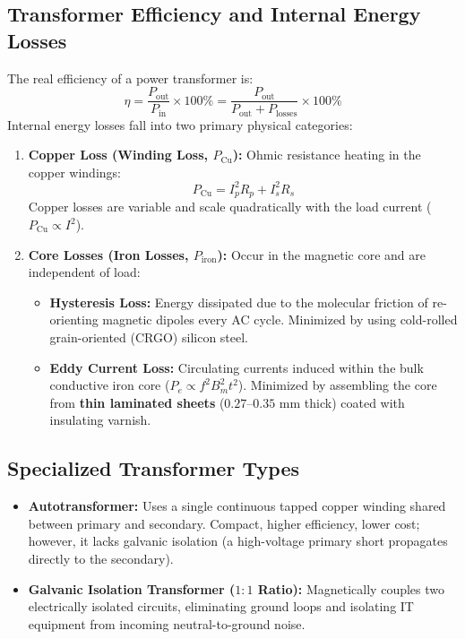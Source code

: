 \subsection{Transformer Efficiency and Internal Energy Losses}
The real efficiency of a power transformer is:
\begin{equation}
\label{eq:transformer_eff}
\eta = \frac{P_{\text{out}}}{P_{\text{in}}} \times 100\% = \frac{P_{\text{out}}}{P_{\text{out}} + P_{\text{losses}}} \times 100\%
\end{equation}
Internal energy losses fall into two primary physical categories:
\begin{enumerate}[label=\bfseries\arabic*.]
    \item \textbf{Copper Loss (Winding Loss, $P_{\text{Cu}}$):} Ohmic resistance heating in the copper windings:
    \begin{equation}
    \label{eq:copper_loss}
    P_{\text{Cu}} = I_p^2 R_p + I_s^2 R_s
    \end{equation}
    Copper losses are variable and scale quadratically with the load current ($P_{\text{Cu}} \propto I^2$).
    \item \textbf{Core Losses (Iron Losses, $P_{\text{iron}}$):} Occur in the magnetic core and are independent of load:
    \begin{itemize}
        \item \textbf{Hysteresis Loss:} Energy dissipated due to the molecular friction of re-orienting magnetic dipoles every AC cycle. Minimized by using cold-rolled grain-oriented (CRGO) silicon steel.
        \item \textbf{Eddy Current Loss:} Circulating currents induced within the bulk conductive iron core ($P_e \propto f^2 B_m^2 t^2$). Minimized by assembling the core from \textbf{thin laminated sheets} ($0.27$--$0.35\text{ mm}$ thick) coated with insulating varnish.
    \end{itemize}
\end{enumerate}

\subsection{Specialized Transformer Types}
\begin{itemize}
    \item \textbf{Autotransformer:} Uses a single continuous tapped copper winding shared between primary and secondary. Compact, higher efficiency, lower cost; however, it lacks galvanic isolation (a high-voltage primary short propagates directly to the secondary).
    \item \textbf{Galvanic Isolation Transformer ($1:1$ Ratio):} Magnetically couples two electrically isolated circuits, eliminating ground loops and isolating IT equipment from incoming neutral-to-ground noise.
\end{itemize}


